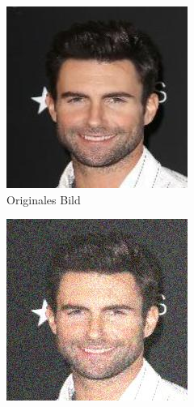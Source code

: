 \begin{figure}[!htb]
\centering
\begin{subfigure}[h]{0.3\textwidth}
  \centering
  \includegraphics[width=\linewidth]{figures/autoencoder_r18/faces_autoencoder1.jpg}
  \caption{Originales Bild}
\end{subfigure}
\begin{subfigure}[h]{0.3\textwidth}
  \centering
  \includegraphics[width=\linewidth]{figures/autoencoder_r18/faces_autoencoder2.jpg}

\end{subfigure}
\end{figure}
